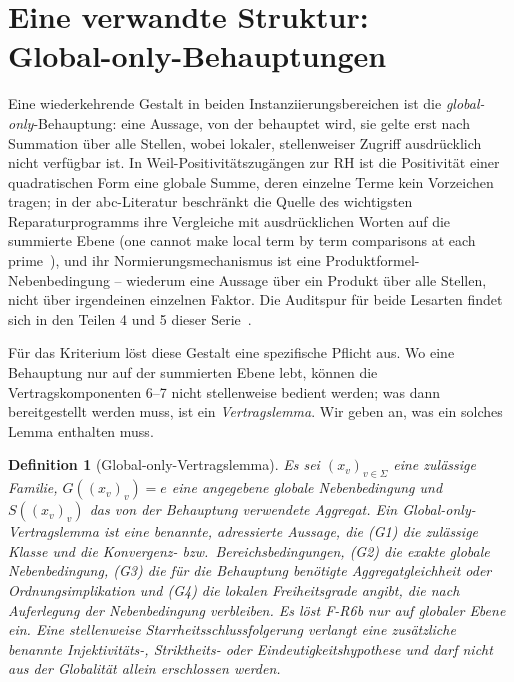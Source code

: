 \documentclass[11pt,a4paper]{article}
\newtheorem{definition}{Definition}[section]
\begin{document}
\section[Eine verwandte Struktur: Global-only-Behauptungen]{Eine verwandte Struktur:\texorpdfstring{\\}{ }Global-only-Behauptungen}\label{sec:global}

Eine wiederkehrende Gestalt in beiden Instanziierungsbereichen ist die
\emph{global-only}-Behauptung: eine Aussage, von der behauptet wird, sie
gelte erst nach Summation über alle Stellen, wobei lokaler, stellenweiser
Zugriff ausdrücklich nicht verfügbar ist. In Weil-Positivitätszugängen zur RH
ist die Positivität einer quadratischen Form eine globale Summe, deren
einzelne Terme kein Vorzeichen tragen; in der abc-Literatur beschränkt die
Quelle des wichtigsten Reparaturprogramms ihre Vergleiche mit ausdrücklichen
Worten auf die summierte Ebene (\glqq one cannot make local term by term
comparisons at each prime\grqq{}~\cite{JoshiATSIII,JoshiATSIV}), und ihr
Normierungsmechanismus ist eine Produktformel-Nebenbedingung -- wiederum
eine Aussage über ein Produkt über alle Stellen, nicht über irgendeinen
einzelnen Faktor. Die Auditspur für beide Lesarten findet sich in den
Teilen 4 und 5 dieser Serie~\cite{part4,part5}.

Für das Kriterium löst diese Gestalt eine spezifische Pflicht aus. Wo eine
Behauptung nur auf der summierten Ebene lebt, können die
Vertragskomponenten 6--7 nicht stellenweise bedient werden; was dann
bereitgestellt werden muss, ist ein \emph{Vertragslemma}. Wir geben an, was
ein solches Lemma enthalten muss.

\begin{definition}[Global-only-Vertragslemma]\label{def:globallemma}
Es sei $(x_v)_{v\in\Sigma}$ eine zulässige Familie, $G((x_v)_v)=e$ eine
angegebene globale Nebenbedingung und $S((x_v)_v)$ das von der Behauptung
verwendete Aggregat. Ein Global-only-Vertragslemma ist eine benannte,
adressierte Aussage, die (G1) die zulässige Klasse und die Konvergenz- bzw.\
Bereichsbedingungen, (G2) die exakte globale Nebenbedingung, (G3) die für die
Behauptung benötigte Aggregatgleichheit oder Ordnungsimplikation und (G4) die
lokalen Freiheitsgrade angibt, die nach Auferlegung der Nebenbedingung
verbleiben. Es löst F-R6b nur auf globaler Ebene ein. Eine stellenweise
Starrheitsschlussfolgerung verlangt eine zusätzliche benannte Injektivitäts-,
Striktheits- oder Eindeutigkeitshypothese und darf nicht aus der Globalität
allein erschlossen werden.
\end{definition}
\end{document}
